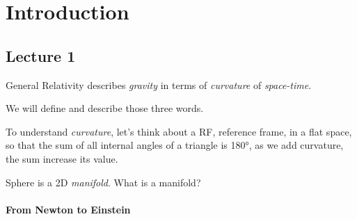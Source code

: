 \chapter{Introduction}

\section{Lecture 1}

General Relativity describes \emph{gravity} in terms of \emph{curvature} of \emph{space-time}.

We will define and describe those three words. 

To understand \emph{curvature}, let's think about a RF, reference frame, in a flat space, so that the sum of all internal angles of a triangle is 180°, as we add curvature, the sum increase its value.

Sphere is a 2D \emph{manifold}. {\tiny What is a manifold?}

\subsubsection{From Newton to Einstein}


